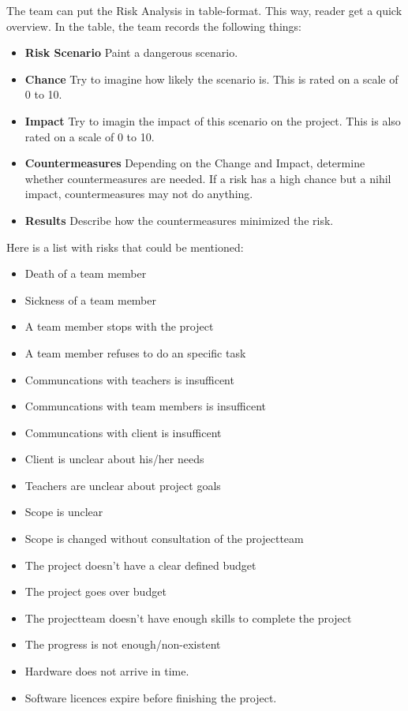 \documentclass[10pt]{report}
\begin{document}
The team can put the Risk Analysis in table-format. This way, reader get a quick overview. In the table, the team records the following things:

\begin{itemize}
	\item \textbf{Risk Scenario} Paint a dangerous scenario.
	\item \textbf{Chance} Try to imagine how likely the scenario is. This is rated on a scale of 0 to 10.
	\item \textbf{Impact} Try to imagin the impact of this scenario on the project. This is also rated on a scale of 0 to 10.  
	\item \textbf{Countermeasures} Depending on the Change and Impact, determine whether countermeasures are needed. If a risk has a high chance but a nihil impact, countermeasures may not do anything.
	\item \textbf{Results} Describe how the countermeasures minimized the risk.  
\end{itemize}

Here is a list with risks that could be mentioned:

\begin{itemize}
	\item Death of a team member
	\item Sickness of a team member
	\item A team member stops with the project
	\item A team member refuses to do an specific task
	\item Communcations with teachers is insufficent
	\item Communcations with team members is insufficent
	\item Communcations with client is insufficent
	\item Client is unclear about his/her needs
	\item Teachers are unclear about project goals
	\item Scope is unclear
	\item Scope is changed without consultation of the projectteam
	\item The project doesn't have a clear defined budget
	\item The project goes over budget
	\item The projectteam doesn't have enough skills to complete the project
	\item The progress is not enough/non-existent
	\item Hardware does not arrive in time.
	\item Software licences expire before finishing the project.
\end{itemize}
\end{document}
